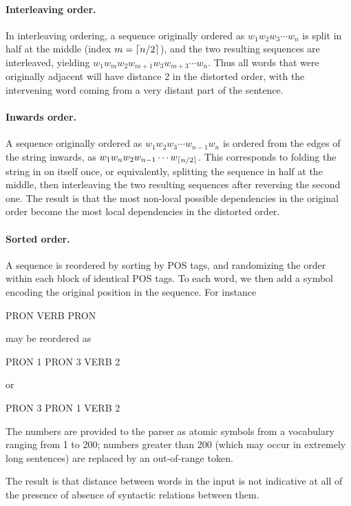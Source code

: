 \documentclass[10pt,twoside,lineno]{article}
\DeclarePairedDelimiter{\ceiling}{\lceil}{\rceil}
\begin{document}
\paragraph{Interleaving order.} In interleaving ordering, a sequence originally ordered as $w_1 w_2 w_3 \cdots w_n$ is split in half at the middle (index $m=\ceiling{n/2}$), and the two resulting sequences are interleaved, yielding $w_1 w_m w_2 w_{m+1} w_3 w_{m+3} \cdots w_n$. Thus all words that were originally adjacent will have distance 2 in the distorted order, with the intervening word coming from a very distant part of the sentence.

\paragraph{Inwards order.} A sequence originally ordered as $w_1 w_2 w_3 \cdots w_{n-1} w_n$ is ordered from the edges of the string inwards, as $w_1 w_n w_2 w_{n-1} \cdots w_{\ceiling{n/2}}$. This corresponds to folding the string in on itself once, or equivalently, splitting the sequence in half at the middle, then interleaving the two resulting sequences after reversing the second one. The result is that the most non-local possible dependencies in the original order become the most local dependencies in the distorted order.

\paragraph{Sorted order.} A sequence is reordered by sorting by POS tags, and randomizing the order within each block of identical POS tags.
To each word, we then add a symbol encoding the original position in the sequence.
For instance
\begin{center}
PRON VERB PRON
\end{center}
may be reordered as
\begin{center}
PRON 1 PRON 3 VERB 2
\end{center}
or
\begin{center}
PRON 3 PRON 1 VERB 2
\end{center}
The numbers are provided to the parser as atomic symbols from a vocabulary ranging from 1 to 200; numbers greater than 200 (which may occur in extremely long sentences) are replaced by an out-of-range token.

The result is that distance between words in the input is not indicative at all of the presence of absence of syntactic relations between them.
\end{document}
